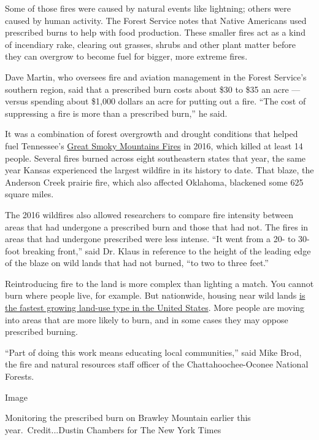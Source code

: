 Some of those fires were caused by natural events like lightning; others
were caused by human activity. The Forest Service notes that Native
Americans used prescribed burns to help with food production. These
smaller fires act as a kind of incendiary rake, clearing out grasses,
shrubs and other plant matter before they can overgrow to become fuel
for bigger, more extreme fires.

Dave Martin, who oversees fire and aviation management in the Forest
Service's southern region, said that a prescribed burn costs about \$30
to \$35 an acre --- versus spending about \$1,000 dollars an acre for
putting out a fire. ``The cost of suppressing a fire is more than a
prescribed burn,'' he said.

It was a combination of forest overgrowth and drought conditions that
helped fuel Tennessee's
\href{https://www.nytimes.com/2016/11/29/us/gatlinburg-tennessee-wildfire.html?searchResultPosition=4}{Great
Smoky Mountains Fires} in 2016, which killed at least 14 people. Several
fires burned across eight southeastern states that year, the same year
Kansas experienced the largest wildfire in its history to date. That
blaze, the Anderson Creek prairie fire, which also affected Oklahoma,
blackened some 625 square miles.

The 2016 wildfires also allowed researchers to compare fire intensity
between areas that had undergone a prescribed burn and those that had
not. The fires in areas that had undergone prescribed were less intense.
``It went from a 20- to 30-foot breaking front,'' said Dr. Klaus in
reference to the height of the leading edge of the blaze on wild lands
that had not burned, ``to two to three feet.''

Reintroducing fire to the land is more complex than lighting a match.
You cannot burn where people live, for example. But nationwide, housing
near wild lands
\href{https://www.nytimes.com/2018/11/15/climate/california-fires-wildland-urban-interface.html}{is
the fastest growing land-use type in the United States}. More people are
moving into areas that are more likely to burn, and in some cases they
may oppose prescribed burning.

``Part of doing this work means educating local communities,'' said Mike
Brod, the fire and natural resources staff officer of the
Chattahoochee-Oconee National Forests.

Image

Monitoring the prescribed burn on Brawley Mountain earlier this
year.~Credit...Dustin Chambers for The New York Times

